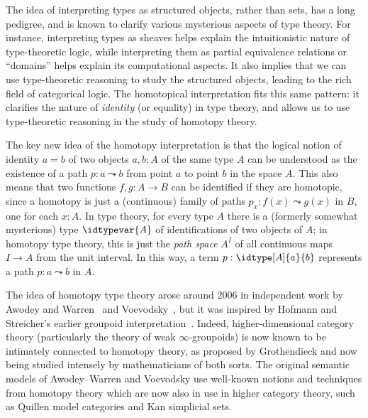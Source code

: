 The idea of interpreting types as structured objects, rather than sets, has a long pedigree, and is known to clarify various mysterious aspects of type theory.
For instance, interpreting types as sheaves helps explain the intuitionistic nature of type-theoretic logic, while interpreting them as partial equivalence relations or ``domains'' helps explain its computational aspects.
It also implies that we can use type-theoretic reasoning to study the structured objects, leading to the rich field of categorical logic.
The homotopical interpretation fits this same pattern: it clarifies the nature of \emph{identity} (or equality) in type theory, and allows us to use type-theoretic reasoning in the study of homotopy theory.

The key new idea of the homotopy interpretation is that the logical notion of identity $a = b$ of two objects $a, b: A$ of the same type $A$ can be understood as the existence of a path $p : a \leadsto b$ from point $a$ to point $b$ in the space $A$.
This also means that two functions $f, g: A\to B$ can be identified if they are homotopic, since a homotopy is just a (continuous) family of paths $p_x: f(x) \leadsto g(x)$ in $B$, one for each $x:A$.
In type theory, for every type $A$ there is a (formerly somewhat mysterious) type $\idtypevar{A}$ of identifications of two objects of $A$; in homotopy type theory, this is just the \emph{path space} $A^I$ of all continuous maps $I\to A$ from the unit interval.
%
%
%
%
In this way, a term $p : \idtype[A]{a}{b}$ represents a path $p : a \leadsto b$ in $A$. 

The idea of homotopy type theory arose around 2006 in independent work by Awodey and Warren~\cite{AW} and Voevodsky~\cite{VV}, but it was inspired by 
Hofmann and Streicher's earlier groupoid interpretation~\cite{hs:gpd-typethy}.
Indeed, higher-dimensional category theory (particularly the theory of weak $\infty$-groupoids) is now known to be intimately connected to homotopy theory, as proposed by Grothendieck and now being studied intensely by mathematicians of both sorts.
The original semantic models of Awodey--Warren and Voevodsky use well-known notions and techniques from homotopy theory which are now also in use in higher category theory, such as  Quillen model categories and Kan simplicial sets.
%
%

